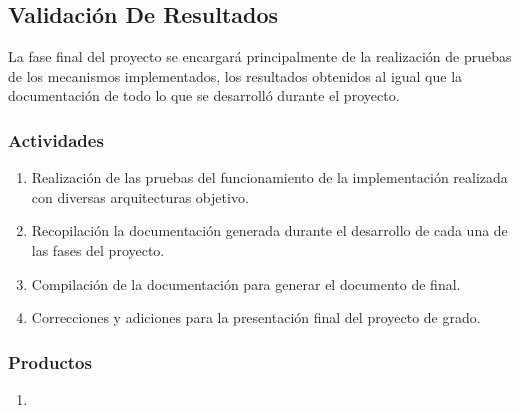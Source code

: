\subsection{Validación De Resultados}

La fase final del proyecto se encargará principalmente de la realización de pruebas de los mecanismos implementados, los resultados obtenidos al igual que la documentación de todo lo que se desarrolló durante el proyecto.

\subsubsection*{Actividades}

\begin{enumerate}
    \itemsep-2mm
    \item Realización de las pruebas del funcionamiento de la implementación realizada con diversas arquitecturas objetivo.
    \item Recopilación la documentación generada durante el desarrollo de cada una de las fases del proyecto.
    \item Compilación de la documentación para generar el documento de final.
    \item Correcciones y adiciones para la presentación final del proyecto de grado.
\end{enumerate}  

\subsubsection*{Productos}

\begin{enumerate}
    \itemsep-2mm
    \item 
\end{enumerate}